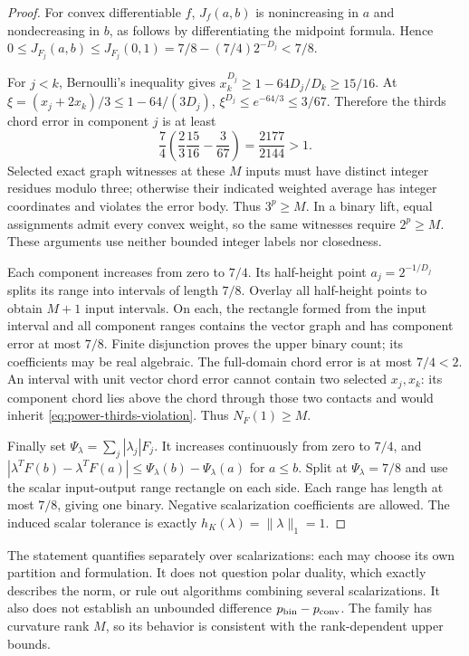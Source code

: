 \begin{proof}
For convex differentiable $f$, $J_f(a,b)$ is nonincreasing in $a$
and nondecreasing in $b$, as follows by differentiating the midpoint
formula. Hence $0\le J_{F_j}(a,b)\le J_{F_j}(0,1)
=7/8-(7/4)2^{-D_j}<7/8$.

For $j<k$, Bernoulli's inequality gives
$x_k^{D_j}\ge1-64D_j/D_k\ge15/16$. At
$\xi=(x_j+2x_k)/3\le1-64/(3D_j)$,
$\xi^{D_j}\le e^{-64/3}\le3/67$. Therefore the thirds chord error
in component $j$ is at least
\begin{equation}\label{eq:power-thirds-violation}
 \frac74\left(\frac23\frac{15}{16}-\frac3{67}\right)
 =\frac{2177}{2144}>1.
\end{equation}
Selected exact graph witnesses at these $M$ inputs must have distinct
integer residues modulo three; otherwise their indicated weighted
average has integer coordinates and violates the error body.
Thus $3^p\ge M$. In a binary lift, equal assignments admit every
convex weight, so the same witnesses require $2^p\ge M$.
These arguments use neither bounded integer labels nor closedness.

Each component increases from zero to $7/4$. Its half-height point
$a_j=2^{-1/D_j}$ splits its range into intervals of length $7/8$.
Overlay all half-height points to obtain $M+1$ input intervals.
On each, the rectangle formed from the input interval and all component
ranges contains the vector graph and has component error at most $7/8$.
Finite disjunction proves the upper binary count; its coefficients may
be real algebraic. The full-domain chord error is at most $7/4<2$.
An interval with unit vector chord error cannot contain two selected
$x_j,x_k$: its component chord lies above the chord through those two
contacts and would inherit \eqref{eq:power-thirds-violation}.
Thus $N_F(1)\ge M$.

Finally set $\Psi_\lambda=\sum_j|\lambda_j|F_j$. It increases
continuously from zero to $7/4$, and
$|\lambda^TF(b)-\lambda^TF(a)|\le\Psi_\lambda(b)-\Psi_\lambda(a)$
for $a\le b$. Split at $\Psi_\lambda=7/8$ and use the scalar
input-output range rectangle on each side. Each range has length at
most $7/8$, giving one binary. Negative scalarization coefficients
are allowed. The induced scalar tolerance is exactly
$h_K(\lambda)=\|\lambda\|_1=1$.
\end{proof}

The statement quantifies separately over scalarizations: each may choose
its own partition and formulation. It does not question polar duality,
which exactly describes the norm, or rule out algorithms combining
several scalarizations. It also does not establish an unbounded difference
$p_{\mathrm{bin}}-p_{\mathrm{conv}}$. The family has curvature rank $M$, so its behavior is
consistent with the rank-dependent upper bounds.

